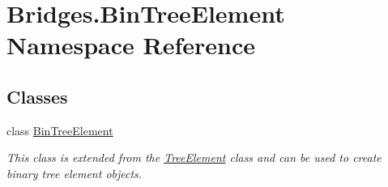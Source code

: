 \hypertarget{namespace_bridges_1_1_bin_tree_element}{}\section{Bridges.\+Bin\+Tree\+Element Namespace Reference}
\label{namespace_bridges_1_1_bin_tree_element}
\subsection*{Classes}
\begin{DoxyCompactItemize}
\item 
class \hyperlink{class_bridges_1_1_bin_tree_element_1_1_bin_tree_element}{Bin\+Tree\+Element}
\begin{DoxyCompactList}\small\item\em This class is extended from the \hyperlink{namespace_bridges_1_1_tree_element}{Tree\+Element} class and can be used to create binary tree element objects. \end{DoxyCompactList}\end{DoxyCompactItemize}
